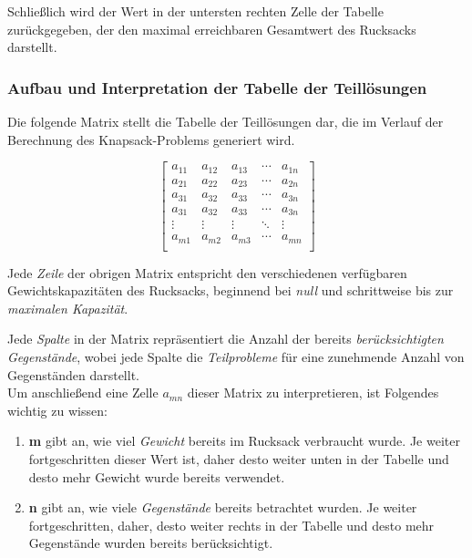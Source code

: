 Schließlich wird der Wert in der untersten rechten Zelle der Tabelle zurückgegeben, der den maximal erreichbaren Gesamtwert
des Rucksacks darstellt.

\subsubsection*{Aufbau und Interpretation der Tabelle der Teillösungen}
Die folgende Matrix stellt die Tabelle der Teillösungen dar, die im Verlauf der Berechnung des Knapsack-Problems generiert
wird.

\[
\left[
\begin{array}{ccccc}
a_{11} & a_{12} & a_{13} & \cdots & a_{1n} \\
a_{21} & a_{22} & a_{23} & \cdots & a_{2n} \\
a_{31} & a_{32} & a_{33} & \cdots & a_{3n} \\
a_{31} & a_{32} & a_{33} & \cdots & a_{3n} \\
\vdots & \vdots & \vdots & \ddots & \vdots \\
a_{m1} & a_{m2} & a_{m3} & \cdots & a_{mn} \\
\end{array}
\right]
\]

Jede \textit{Zeile} der obrigen Matrix entspricht den verschiedenen verfügbaren Gewichtskapazitäten des Rucksacks, beginnend
bei \textit{null} und schrittweise bis zur \textit{maximalen Kapazität}.

Jede \textit{Spalte} in der Matrix repräsentiert die Anzahl der bereits \textit{berücksichtigten Gegenstände}, wobei jede
Spalte die \textit{Teilprobleme} für eine zunehmende Anzahl von Gegenständen darstellt.\\

Um anschließend eine Zelle \( a_{mn} \) dieser Matrix zu interpretieren, ist Folgendes wichtig zu wissen:
\begin{enumerate}
    \item \textbf{m} gibt an, wie viel \textit{Gewicht} bereits im Rucksack verbraucht wurde. Je weiter fortgeschritten dieser
    Wert ist, daher desto weiter unten in der Tabelle und desto mehr Gewicht wurde bereits verwendet.
    \item \textbf{n} gibt an, wie viele \textit{Gegenstände} bereits betrachtet wurden. Je weiter fortgeschritten, daher,
    desto weiter rechts in der Tabelle und desto mehr Gegenstände wurden bereits berücksichtigt.
\end{enumerate}


